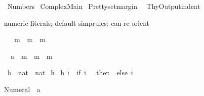 %
\begin{isabellebody}%
\def\isabellecontext{Numbers}%
%
\isadelimtheory
%
\endisadelimtheory
%
\isatagtheory
{}\isamarkupfalse%
\ Numbers\isanewline
{}\ Complex{\isacharunderscore}Main\isanewline
{}%
\endisatagtheory
{\isafoldtheory}%
%
\isadelimtheory
\isanewline
%
\endisadelimtheory
%
\isadelimML
\isanewline
%
\endisadelimML
%
\isatagML
{}\isamarkupfalse%
\ {\isachardoublequoteopen}Pretty{\isachardot}setmargin\ {}{}{\isachardoublequoteclose}\isanewline
{}\isamarkupfalse%
\ {\isachardoublequoteopen}ThyOutput{\isachardot}indent\ {\isacharcolon}{\isacharequal}\ {}{\isachardoublequoteclose}%
\endisatagML
{\isafoldML}%
%
\isadelimML
%
\endisadelimML
%
\begin{isamarkuptext}%
numeric literals; default simprules; can re-orient%
\end{isamarkuptext}%
\isamarkuptrue%
\isamarkupfalse%
\ {\isachardoublequoteopen}{}\ {\isacharasterisk}\ m\ {\isacharequal}\ m\ {\isacharplus}\ m{\isachardoublequoteclose}%
\isadelimproof
%
\endisadelimproof
%
\isatagproof
%
\begin{isamarkuptxt}%
\begin{isabelle}%
\ {}{\isachardot}\ {\isacharparenleft}{}{\isasymColon}{\isacharprime}a{\isacharparenright}\ {\isacharasterisk}\ m\ {\isacharequal}\ m\ {\isacharplus}\ m%
\end{isabelle}%
\end{isamarkuptxt}%
\isamarkuptrue%
\isamarkupfalse%
%
\endisatagproof
{\isafoldproof}%
%
\isadelimproof
%
\endisadelimproof
\isanewline
\isanewline
{}\isamarkupfalse%
\ h\ {\isacharcolon}{\isacharcolon}\ {\isachardoublequoteopen}nat\ {\isasymRightarrow}\ nat{\isachardoublequoteclose}\isanewline
{}\isamarkupfalse%
\ h\ {\isachardoublequoteopen}{\isacharbraceleft}{\isacharbraceright}{\isachardoublequoteclose}\isanewline
{\isachardoublequoteopen}h\ i\ {\isacharequal}\ {\isacharparenleft}if\ i\ {\isacharequal}\ {}\ then\ {}\ else\ i{\isacharparenright}{\isachardoublequoteclose}%
\begin{isamarkuptext}%
%
\end{isamarkuptext}%
\isamarkuptrue%
%
\begin{isamarkuptext}%
\begin{isabelle}%
Numeral{}\ {\isacharequal}\ {\isacharparenleft}{}{\isasymColon}{\isacharprime}a{\isacharparenright}%
\end{isabelle}


\end{isamarkuptext}
\end{isabellebody}

